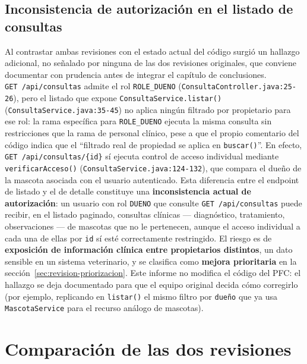 \subsection{Inconsistencia de autorizaci\'on en el listado de consultas}
\label{sec:revision-consultas-riesgo}

Al contrastar ambas revisiones con el estado actual del c\'odigo surgi\'o un
hallazgo adicional, no se\~nalado por ninguna de las dos revisiones
originales, que conviene documentar con prudencia antes de integrar el
cap\'itulo de conclusiones. \texttt{GET~/api/consultas} admite el rol
\texttt{ROLE\_DUENO} (\texttt{ConsultaController.java:25-26}), pero el
listado que expone \texttt{ConsultaService.listar()}
(\texttt{ConsultaService.java:35-45}) no aplica ning\'un filtrado por
propietario para ese rol: la rama espec\'ifica para \texttt{ROLE\_DUENO}
ejecuta la misma consulta sin restricciones que la rama de personal
cl\'inico, pese a que el propio comentario del c\'odigo indica que el
``filtrado real de propiedad se aplica en \texttt{buscar()}''. En efecto,
\texttt{GET~/api/consultas/\{id\}} s\'i ejecuta control de acceso individual
mediante \texttt{verificarAcceso()} (\texttt{ConsultaService.java:124-132}),
que compara el due\~no de la mascota asociada con el usuario autenticado.
Esta diferencia entre el endpoint de listado y el de detalle constituye una
\textbf{inconsistencia actual de autorizaci\'on}: un usuario con rol
\texttt{DUENO} que consulte \texttt{GET~/api/consultas} puede recibir, en el
listado paginado, consultas cl\'inicas --- diagn\'ostico, tratamiento,
observaciones --- de mascotas que no le pertenecen, aunque el acceso
individual a cada una de ellas por \texttt{id} s\'i est\'e correctamente
restringido. El riesgo es de \textbf{exposici\'on de informaci\'on cl\'inica
entre propietarios distintos}, un dato sensible en un sistema veterinario, y
se clasifica como \textbf{mejora prioritaria} en la
secci\'on~\ref{sec:revision-priorizacion}. Este informe no modifica el
c\'odigo del PFC: el hallazgo se deja documentado para que el equipo
original decida c\'omo corregirlo (por ejemplo, replicando en
\texttt{listar()} el mismo filtro por \texttt{due\~no} que ya usa
\texttt{MascotaService} para el recurso an\'alogo de mascotas).

\section{Comparaci\'on de las dos revisiones}
\label{sec:revision-comparacion}

